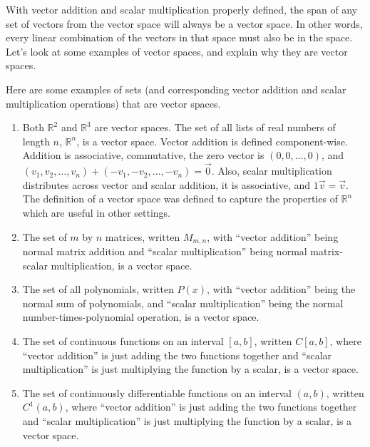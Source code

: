 With vector addition and scalar multiplication properly defined, the span of any set of vectors from the vector space will always be a vector space. In other words, every linear combination of the vectors in that space must also be in the space.  Let's look at some examples of vector spaces, and explain why they are vector spaces.

\begin{example}
Here are some examples of sets (and corresponding vector addition and scalar multiplication operations) that are vector spaces.
\begin{enumerate}
	\item Both ${\mathbb{R}}^2$ and ${\mathbb{R}}^3$ are vector spaces. The set of all lists of real numbers of length $n$, ${\mathbb{R}}^n$, is a vector space.  Vector addition is defined component-wise. Addition is associative, commutative, the zero vector is $(0,0,\ldots,0)$, and $(v_1,v_2,\ldots,v_n)+(-v_1,-v_2,\ldots,-v_n)=\vec 0$. Also, scalar multiplication distributes across vector and scalar addition, it is associative, and $1\vec v=\vec v$.  The definition of a vector space was defined to capture the properties of ${\mathbb{R}}^n$ which are useful in other settings.
	\item The set of $m$ by $n$ matrices, written $M_{m,n}$, with ``vector addition'' being normal matrix addition and ``scalar multiplication'' being normal matrix-scalar multiplication, is a vector space.
	\item The set of all polynomials, written $P(x)$, with ``vector addition'' being the normal sum of polynomials, and ``scalar multiplication'' being the normal number-times-polynomial operation, is a vector space.
	\item The set of continuous functions on an interval $[a,b]$, written $C[a,b]$, where ``vector addition'' is just adding the two functions together and ``scalar multiplication'' is just multiplying the function by a scalar, is a vector space.
	\item The set of continuously differentiable functions on an interval $(a,b)$, written $C^1(a,b)$, where ``vector addition'' is just adding the two functions together and ``scalar multiplication'' is just multiplying the function by a scalar, is a vector space.
\end{enumerate}
\end{example}

